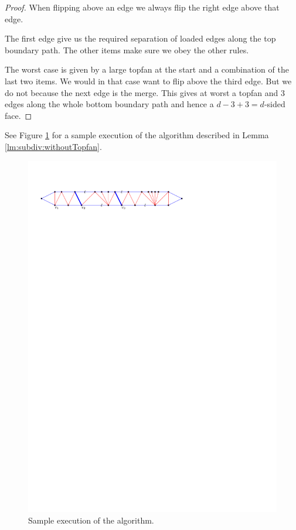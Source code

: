 \begin{proof}
  When flipping above an edge we always flip the right edge above that edge.

  The first edge give us the required separation of loaded edges along the top boundary path. The other items make sure we obey the other rules.

  The worst case is given by a large topfan at the start and  a combination of the last two items. We would in that case want to flip above the third edge. But we do not because the next edge is the merge. This gives at worst a topfan and 3 edges along the whole bottom boundary path and hence a $ d - 3 +3 = d$-sided face.
  \end{proof}

  See Figure \ref{fig:subdiv:sampleExecution} for a sample execution of the algorithm described in Lemma \ref{lm:subdiv:withoutTopfan}.

  \begin{figure}[h]
    \centering
    \includegraphics[scale=1]{blueFaceSubdivision/img/sampleExecution}
    \caption{Sample execution of the algorithm.}
    \label{fig:subdiv:sampleExecution}
  \end{figure}

